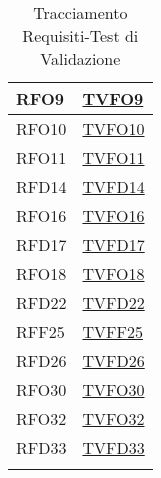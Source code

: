 \begin{longtable}{|>{\centering}m{5cm}|m{5cm}<{\centering}|}
RFO9 & \hyperlink{TVFO9}{TVFO9}\\ \hline
RFO10 & \hyperlink{TVFO10}{TVFO10}\\ \hline
RFO11 & \hyperlink{TVFO11}{TVFO11}\\ \hline
RFD14 & \hyperlink{TVFD14}{TVFD14}\\ \hline
RFO16 & \hyperlink{TVFO16}{TVFO16}\\ \hline
RFD17 & \hyperlink{TVFD17}{TVFD17}\\ \hline
RFO18 & \hyperlink{TVFO18}{TVFO18}\\ \hline
RFD22 & \hyperlink{TVFD22}{TVFD22}\\ \hline
RFF25 & \hyperlink{TVFF25}{TVFF25}\\ \hline
RFD26 & \hyperlink{TVFD26}{TVFD26}\\ \hline
RFO30 & \hyperlink{TVFO30}{TVFO30}\\ \hline
RFO32 & \hyperlink{TVFO32}{TVFO32}\\ \hline
RFD33 & \hyperlink{TVFD33}{TVFD33}\\ \hline
\caption[Tracciamento Requisiti-Test di Validazione]{Tracciamento Requisiti-Test di Validazione}
\label{tabella:requi-tv}
\end{longtable}
\clearpage
